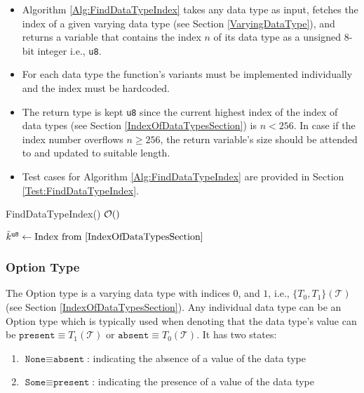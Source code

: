 \documentclass[../alan-handbook.tex]{subfiles}
\begin{document}
\label{FindDataTypeIndex}

\begin{itemize}
    \item Algorithm \ref{Alg:FindDataTypeIndex} takes any data type as input, fetches the index of a given varying data type (see Section \ref{VaryingDataType}), and returns a variable that contains the index $n$ of its data type as a unsigned 8-bit integer i.e., \texttt{u8}. 
    \item For each data type the function's variants must be implemented individually and the index must be hardcoded.
    \item The return type is kept \texttt{u8} since the current highest index of the index of data types (see Section \ref{IndexOfDataTypesSection}) is $n<256$. In case if the index number overflows $n\geq256$, the return variable's size should be attended to and updated to suitable length. 
    \item Test cases for Algorithm \ref{Alg:FindDataTypeIndex} are provided in Section \ref{Test:FindDataTypeIndex}.
\end{itemize}

\begin{algorithm}
\caption{FindDataTypeIndex() \hfill $\mathcal{O}()$}
\label{Alg:FindDataTypeIndex}
\begin{algorithmic}[1]

    \Return $\tilde{k}^{\texttt{u8}} \gets \text{Index from } \ref{IndexOfDataTypesSection}$ 
\EndFunction

\end{algorithmic}
\end{algorithm}

\subsubsection{Option Type} 
\label{OptionType}

The Option type is a varying data type with indices $0$, and $1$, i.e., $\{T_0, T_1\}(\mathcal{T})$ (see Section \ref{IndexOfDataTypesSection}). Any individual data type can be an Option type which is typically used when denoting that the data type's value can be $\texttt{present} \equiv T_1(\mathcal{T})$ or $\texttt{absent} \equiv T_0(\mathcal{T})$. It has two states: 
\begin{enumerate}
    \item $\texttt{None} \equiv \texttt{absent}$: indicating the absence of a value of the data type
    \item $\texttt{Some} \equiv \texttt{present}$: indicating the presence of a value of the data type
\end{enumerate}
\end{document}
